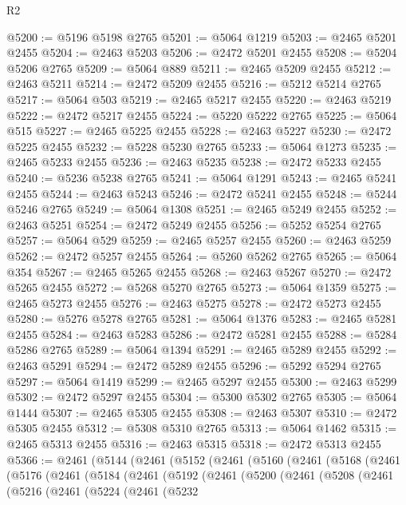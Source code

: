 \begin{lexlean}{R2}
\begin{coremodule}
@5200 := @5196 @5198 @2765
@5201 := @5064 @1219
@5203 := @2465 @5201 @2455
@5204 := @2463 @5203
@5206 := @2472 @5201 @2455
@5208 := @5204 @5206 @2765
@5209 := @5064 @889
@5211 := @2465 @5209 @2455
@5212 := @2463 @5211
@5214 := @2472 @5209 @2455
@5216 := @5212 @5214 @2765
@5217 := @5064 @503
@5219 := @2465 @5217 @2455
@5220 := @2463 @5219
@5222 := @2472 @5217 @2455
@5224 := @5220 @5222 @2765
@5225 := @5064 @515
@5227 := @2465 @5225 @2455
@5228 := @2463 @5227
@5230 := @2472 @5225 @2455
@5232 := @5228 @5230 @2765
@5233 := @5064 @1273
@5235 := @2465 @5233 @2455
@5236 := @2463 @5235
@5238 := @2472 @5233 @2455
@5240 := @5236 @5238 @2765
@5241 := @5064 @1291
@5243 := @2465 @5241 @2455
@5244 := @2463 @5243
@5246 := @2472 @5241 @2455
@5248 := @5244 @5246 @2765
@5249 := @5064 @1308
@5251 := @2465 @5249 @2455
@5252 := @2463 @5251
@5254 := @2472 @5249 @2455
@5256 := @5252 @5254 @2765
@5257 := @5064 @529
@5259 := @2465 @5257 @2455
@5260 := @2463 @5259
@5262 := @2472 @5257 @2455
@5264 := @5260 @5262 @2765
@5265 := @5064 @354
@5267 := @2465 @5265 @2455
@5268 := @2463 @5267
@5270 := @2472 @5265 @2455
@5272 := @5268 @5270 @2765
@5273 := @5064 @1359
@5275 := @2465 @5273 @2455
@5276 := @2463 @5275
@5278 := @2472 @5273 @2455
@5280 := @5276 @5278 @2765
@5281 := @5064 @1376
@5283 := @2465 @5281 @2455
@5284 := @2463 @5283
@5286 := @2472 @5281 @2455
@5288 := @5284 @5286 @2765
@5289 := @5064 @1394
@5291 := @2465 @5289 @2455
@5292 := @2463 @5291
@5294 := @2472 @5289 @2455
@5296 := @5292 @5294 @2765
@5297 := @5064 @1419
@5299 := @2465 @5297 @2455
@5300 := @2463 @5299
@5302 := @2472 @5297 @2455
@5304 := @5300 @5302 @2765
@5305 := @5064 @1444
@5307 := @2465 @5305 @2455
@5308 := @2463 @5307
@5310 := @2472 @5305 @2455
@5312 := @5308 @5310 @2765
@5313 := @5064 @1462
@5315 := @2465 @5313 @2455
@5316 := @2463 @5315
@5318 := @2472 @5313 @2455
@5366 := @2461
    (@5144
      (@2461
        (@5152
          (@2461
            (@5160
              (@2461
                (@5168
                  (@2461
                    (@5176
                      (@2461
                        (@5184
                          (@2461
                            (@5192
                              (@2461
                                (@5200
                                  (@2461
                                    (@5208
                                      (@2461
                                        (@5216
                                          (@2461
                                            (@5224
                                              (@2461
                                                (@5232

\end{coremodule}
\end{lexlean}
